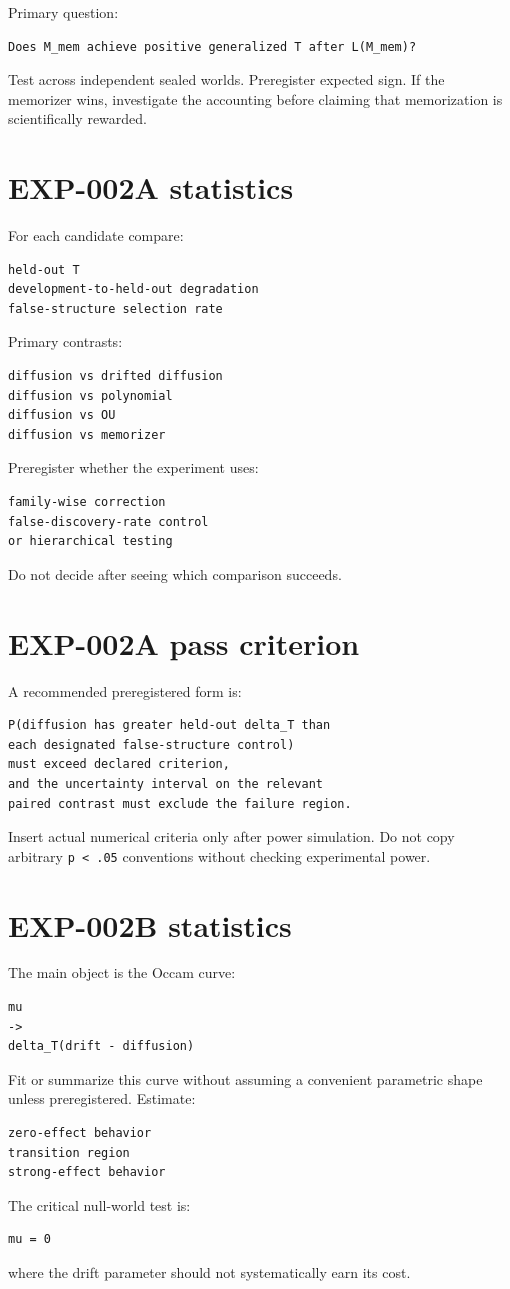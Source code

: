 \documentclass[11pt]{article}
\begin{document}
Primary question:
\begin{verbatim}
Does M_mem achieve positive generalized T after L(M_mem)?
\end{verbatim}
Test across independent sealed worlds. Preregister expected sign. If the memorizer wins, investigate the accounting before claiming that memorization is scientifically rewarded.

\section{EXP-002A statistics}

For each candidate compare:
\begin{verbatim}
held-out T
development-to-held-out degradation
false-structure selection rate
\end{verbatim}
Primary contrasts:
\begin{verbatim}
diffusion vs drifted diffusion
diffusion vs polynomial
diffusion vs OU
diffusion vs memorizer
\end{verbatim}
Preregister whether the experiment uses:
\begin{verbatim}
family-wise correction
false-discovery-rate control
or hierarchical testing
\end{verbatim}
Do not decide after seeing which comparison succeeds.

\section{EXP-002A pass criterion}

A recommended preregistered form is:
\begin{verbatim}
P(diffusion has greater held-out delta_T than
each designated false-structure control)
must exceed declared criterion,
and the uncertainty interval on the relevant
paired contrast must exclude the failure region.
\end{verbatim}
Insert actual numerical criteria only after power simulation. Do not copy arbitrary \texttt{p < .05} conventions without checking experimental power.

\section{EXP-002B statistics}

The main object is the Occam curve:
\begin{verbatim}
mu
->
delta_T(drift - diffusion)
\end{verbatim}
Fit or summarize this curve without assuming a convenient parametric shape unless preregistered. Estimate:
\begin{verbatim}
zero-effect behavior
transition region
strong-effect behavior
\end{verbatim}
The critical null-world test is:
\begin{verbatim}
mu = 0
\end{verbatim}
where the drift parameter should not systematically earn its cost.
\end{document}
